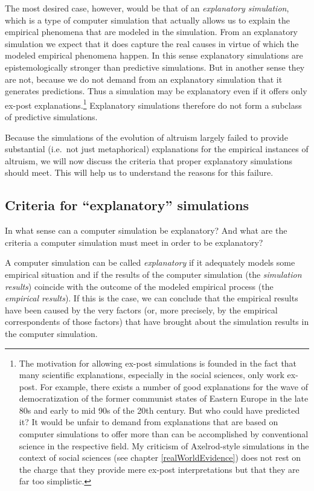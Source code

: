 The most desired case, however, would be that of an {\em explanatory
  simulation}, which is a type of computer simulation that actually allows us
to explain the empirical phenomena that are modeled in the simulation. From an
explanatory simulation we expect that it does capture the real causes in
virtue of which the modeled empirical phenomena happen.  In this sense
explanatory simulations are epistemologically stronger than predictive
simulations. But in another sense they are not, because we do not demand from
an explanatory simulation that it generates predictions. Thus a simulation may
be explanatory even if it offers only ex-post explanations.\footnote{The
  motivation for allowing ex-post simulations is founded in the fact that many
  scientific explanations, especially in the social sciences, only work
  ex-post. For example, there exists a number of good explanations for the
  wave of democratization of the former communist states of Eastern Europe in
  the late 80s and early to mid 90s of the 20th century. But who could have
  predicted it? It would be unfair to demand from explanations that are based
  on computer simulations to offer more than can be accomplished by
  conventional science in the respective field. My criticism of Axelrod-style
  simulations in the context of social sciences (see chapter
  \ref{realWorldEvidence}) does not rest on the charge that they provide mere
  ex-post interpretations but that they are far too simplistic.} Explanatory
simulations therefore do not form a subclass of predictive simulations.

Because the simulations of the evolution of altruism largely failed to provide
substantial (i.e.\ not just metaphorical) explanations for the empirical
instances of altruism, we will now discuss the criteria that proper
explanatory simulations should meet. This will help us to understand the
reasons for this failure.

\subsection{Criteria for ``explanatory'' simulations}
\label{validationCriteria}

In what sense can a computer simulation be explanatory? And what
are the criteria a computer simulation must meet in order to be
explanatory?

A computer simulation can be called {\em explanatory} if it
adequately models some empirical situation and if the results of the
computer simulation (the {\em simulation results}) coincide with the
outcome of the modeled empirical process (the {\em empirical
results}). If this is the case, we can conclude that the empirical results
have been caused by the very factors (or, more precisely, by the empirical
correspondents of those factors) that have brought about the simulation
results in the computer simulation.

